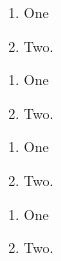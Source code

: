 \begin{enumerate}
	\item One
	\item
	      Two.
\end{enumerate}

\begin{enumerate}
	\item One
	\item%
	      Two.
\end{enumerate}

\begin{enumerate}
	\item One
	\item[]%
	      Two.
\end{enumerate}

\begin{enumerate}
	\item One
	\item<+->%
	      Two.
\end{enumerate}
